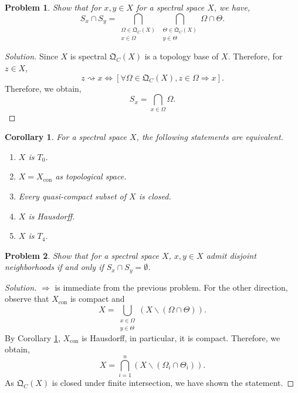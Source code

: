 \documentclass[8pt]{article}
\numberwithin{equation}{section}
\newenvironment{solution}{\begin{proof}[Solution]}{\end{proof}}
\newtheorem{corollary}{Corollary} [section]
\newtheorem{problem}{Problem}[section]
\DeclareMathOperator{\con}{con}
\newcommand{\QC}[0]{\mathfrak{Q}_C}
\begin{document}
\begin{problem}
  Show that for $x,y\in X$ for a spectral space $X$, we have,
  \begin{equation*}
    S_x\cap S_y = \bigcap_{\substack{\Omega\in\QC(X)\\x\in\Omega}}\bigcap_{\substack{\Theta\in\QC(X)\\y\in\Theta}}\Omega\cap \Theta.
  \end{equation*}
\end{problem}
\begin{solution}
  Since $X$ is spectral $\QC(X)$ is a topology base of $X$. Therefore, for $z\in X$, 
  \begin{equation*}
    z\rightsquigarrow x\iff [\forall \Omega\in\QC(X), z\in \Omega\Rightarrow x].
  \end{equation*}
  Therefore, we obtain,
  \begin{equation*}
    S_x = \bigcap_{x\in\Omega}\Omega.
  \end{equation*}
\end{solution}
\begin{corollary}
    \label{corollary_6}
    For a spectral space $X$, the following statements are equivalent.
    \begin{enumerate}
        \item $X$ is $T_0$.
        \item $X=X_{\con}$ as topological space.
        \item Every quasi-compact subset of $X$ is closed.
        \item $X$ is Hausdorff.
        \item $X$ is $T_4$.
    \end{enumerate}
\end{corollary}
\begin{problem}
  Show that for a spectral space $X$, $x,y\in X$ admit disjoint neighborhoods if and only if $S_x\cap S_y =\emptyset$.
\end{problem}
\begin{solution}
  $\Rightarrow$ is immediate from the previous problem. For the other direction, observe that $X_{\con}$ is compact and
  \begin{equation*}
    X = \bigcup_{\substack{x\in\Omega\\ y\in\Theta}}(X\backslash (\Omega\cap\Theta)).
  \end{equation*}
  By Corollary \ref{corollary_6}, $X_{\con}$ is Hausdorff, in particular, it is compact. Therefore, we obtain,
  \begin{equation*}
    X = \bigcap_{i=1}^n (X\backslash(\Omega_i\cap \Theta_i)).
  \end{equation*}
  As $\QC(X)$ is closed under finite intersection, we have shown the statement.
\end{solution}
\end{document}
